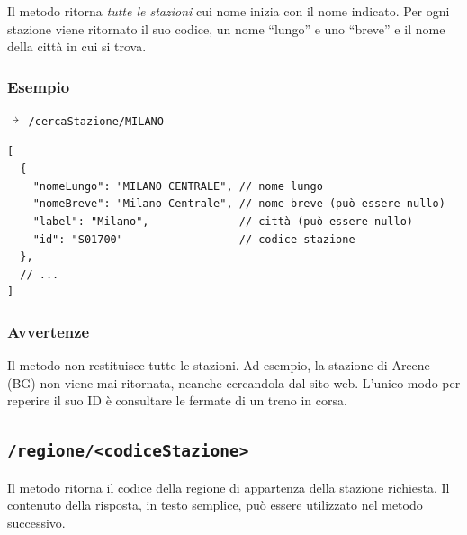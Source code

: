 \documentclass[12pt,italian]{report}
\begin{document}
Il metodo ritorna \textit{tutte le stazioni} cui nome inizia con il
nome indicato.  Per ogni stazione viene ritornato il suo codice, un
nome ``lungo'' e uno ``breve'' e il nome della città in cui si trova.

\subsubsection{Esempio}

$\Rsh$ \texttt{/cercaStazione/MILANO}
\begin{verbatim}
[
  {
    "nomeLungo": "MILANO CENTRALE", // nome lungo
    "nomeBreve": "Milano Centrale", // nome breve (può essere nullo)
    "label": "Milano",              // città (può essere nullo)
    "id": "S01700"                  // codice stazione
  },
  // ...
]
\end{verbatim}

\subsubsection{Avvertenze}

Il metodo non restituisce tutte le stazioni.  Ad esempio, la stazione
di Arcene (BG) non viene mai ritornata, neanche cercandola dal sito
web.  L'unico modo per reperire il suo ID è consultare le fermate di
un treno in corsa.

\subsection{\texttt{/regione/<codiceStazione>}}

Il metodo ritorna il codice della regione di appartenza della stazione
richiesta.  Il contenuto della risposta, in testo semplice, può essere
utilizzato nel metodo successivo.
\end{document}
